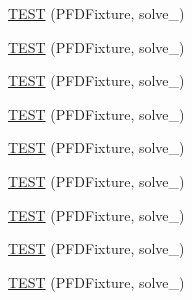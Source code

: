 \begin{DoxyCompactItemize}
\item 
\hyperlink{bmk447-TestPFD_8c_09_09_aa23a55abbaab38d30093f05880927102}{\-T\-E\-S\-T} (\-P\-F\-D\-Fixture, solve\-\_)
\item 
\hyperlink{bmk447-TestPFD_8c_09_09_a0bfee5bdfce5835ee3c258c88e61ccef}{\-T\-E\-S\-T} (\-P\-F\-D\-Fixture, solve\-\_)
\item 
\hyperlink{bmk447-TestPFD_8c_09_09_ad8fe4b88c588f742bf125c129fa3d94f}{\-T\-E\-S\-T} (\-P\-F\-D\-Fixture, solve\-\_)
\item 
\hyperlink{bmk447-TestPFD_8c_09_09_a14f18a21a33a984099d707bf7ff31804}{\-T\-E\-S\-T} (\-P\-F\-D\-Fixture, solve\-\_)
\item 
\hyperlink{bmk447-TestPFD_8c_09_09_a6a02f042348fec59bd2eb47aba60a21b}{\-T\-E\-S\-T} (\-P\-F\-D\-Fixture, solve\-\_)
\item 
\hyperlink{bmk447-TestPFD_8c_09_09_ae8c7370b9ca28631c2e20bd27732f644}{\-T\-E\-S\-T} (\-P\-F\-D\-Fixture, solve\-\_)
\item 
\hyperlink{bmk447-TestPFD_8c_09_09_a2b39ebfcf51cbff742fd853c18e64018}{\-T\-E\-S\-T} (\-P\-F\-D\-Fixture, solve\-\_)
\item 
\hyperlink{bmk447-TestPFD_8c_09_09_a9bdceab5af2de150de815fc1cf7ed672}{\-T\-E\-S\-T} (\-P\-F\-D\-Fixture, solve\-\_)
\item 
\hyperlink{bmk447-TestPFD_8c_09_09_a6f6d464d4394c5f1979fe92ba395f9d4}{\-T\-E\-S\-T} (\-P\-F\-D\-Fixture, solve\-\_)
\end{DoxyCompactItemize}


